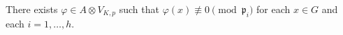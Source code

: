 There exists $\varphi \in A \otimes V_{K,p}$ such that $\varphi(x) \not\equiv 0 \pmod{\mathfrak{p}_i}$ for each $x \in G$ and each $i = 1, \ldots, h$.
